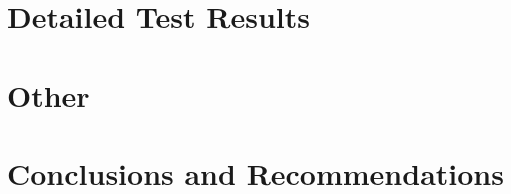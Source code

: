\documentclass[11pt,fleqn]{book} %
\begin{document}


\chapter{Detailed Test Results}



\chapter{Other}


\chapter{Conclusions and Recommendations}
\end{document}
